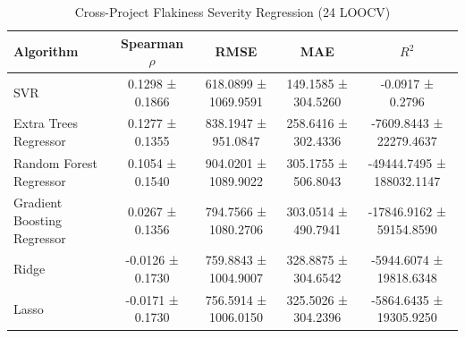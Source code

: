 \begin{table}
\caption{Cross-Project Flakiness Severity Regression (24 LOOCV)}
\label{tab:reg_summary}
\begin{tabular}{lcccc}
\toprule
Algorithm & Spearman $\rho$ & RMSE & MAE & $R^2$ \\
\midrule
SVR & 0.1298 ± 0.1866 & 618.0899 ± 1069.9591 & 149.1585 ± 304.5260 & -0.0917 ± 0.2796 \\
Extra Trees Regressor & 0.1277 ± 0.1355 & 838.1947 ± 951.0847 & 258.6416 ± 302.4336 & -7609.8443 ± 22279.4637 \\
Random Forest Regressor & 0.1054 ± 0.1540 & 904.0201 ± 1089.9022 & 305.1755 ± 506.8043 & -49444.7495 ± 188032.1147 \\
Gradient Boosting Regressor & 0.0267 ± 0.1356 & 794.7566 ± 1080.2706 & 303.0514 ± 490.7941 & -17846.9162 ± 59154.8590 \\
Ridge & -0.0126 ± 0.1730 & 759.8843 ± 1004.9007 & 328.8875 ± 304.6542 & -5944.6074 ± 19818.6348 \\
Lasso & -0.0171 ± 0.1730 & 756.5914 ± 1006.0150 & 325.5026 ± 304.2396 & -5864.6435 ± 19305.9250 \\
\bottomrule
\end{tabular}
\end{table}
